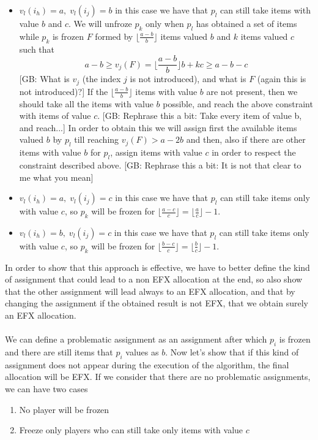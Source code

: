 \documentclass{article}
\newcommand{\gb}[1]{{\color{red}[GB: #1]}}
\begin{document}
\begin{itemize}
    \item $v_l(i_h) = a,\; v_l(i_j) =  b$ in this case we have that $p_l$ can still take items with value $b$ and $c$. We will unfroze $p_k$ only when $p_l$ has obtained a set of items while $p_k$ is frozen $F$ formed by $\lfloor \frac{a-b}{b}\rfloor$ items valued $b$ and $k$ items valued $c$ such that
    \begin{equation}
        a-b\ge v_j(F) = \lfloor \frac{a-b}{b}\rfloor b + kc \ge a-b-c
        \label{eq:constraint-value-freeze-a-b-c}
    \end{equation}
    \gb{What is $v_j$ (the index $j$ is not introduced), and what is $F$ (again this is not introduced)?}
    If the $\lfloor\frac{a-b}{b}\rfloor$ items with value $b$ are not present, then we should take all the items with value $b$ possible, and reach the above constraint with items of value $c$.
    \gb{Rephrase this a bit: Take every item of value b, and reach...}
    In order to obtain this we will assign first the available items valued $b$ by $p_l$ till reaching $v_j(F) > a-2b$ and then, also if there are other items with value $b$ for $p_l$, assign items with value $c$ in order to respect the constraint described above.
    \gb{Rephrase this a bit: It is not that clear to me what you mean}
    \item $v_l(i_h) = a,\; v_l(i_j) =  c$ in this case we have that $p_l$ can still take items only with value $c$, so $p_k$ will be frozen for $\lfloor \frac{a-c}{c}\rfloor = \lfloor \frac{a}{c}\rfloor - 1$.
    \item $v_l(i_h) = b,\; v_l(i_j) =  c$ in this case we have that $p_l$ can still take items only with value $c$, so $p_k$ will be frozen for $\lfloor \frac{b-c}{c}\rfloor = \lfloor \frac{b}{c}\rfloor - 1$.
\end{itemize}
In order to show that this approach is effective, we have to better define the kind of assignment that could lead to a non EFX allocation at the end, so also show that the other assignment will lead always to an EFX allocation, and that by changing the assignment if the obtained result is not EFX, that we obtain surely an EFX allocation.
\paragraph{}
We can define a problematic assignment as an assignment after which $p_i$ is frozen and there are still items that $p_i$ values as $b$. Now let's show that if this kind of assignment does not appear during the execution of the algorithm, the final allocation will be EFX. If we consider that there are no problematic assignments, we can have two cases
\begin{enumerate}
    \item No player will be frozen
    \item Freeze only players who can still take only items with value $c$ 
\end{enumerate}
\end{document}
